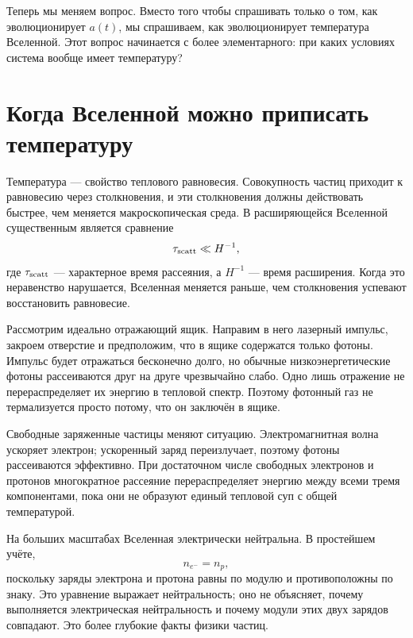 Теперь мы меняем вопрос. Вместо того чтобы спрашивать только о том, как эволюционирует \(a(t)\), мы спрашиваем, как эволюционирует температура Вселенной. Этот вопрос начинается с более элементарного: при каких условиях система вообще имеет температуру?

\section{Когда Вселенной можно приписать температуру}

Температура — свойство теплового равновесия. Совокупность частиц приходит к равновесию через столкновения, и эти столкновения должны действовать быстрее, чем меняется макроскопическая среда. В расширяющейся Вселенной существенным является сравнение
\begin{equation}
\tau_{\rm scatt}\ll H^{-1},
\label{eq:c07-equilibrium-condition}
\end{equation}
где \(\tau_{\rm scatt}\) — характерное время рассеяния, а \(H^{-1}\) — время расширения. Когда это неравенство нарушается, Вселенная меняется раньше, чем столкновения успевают восстановить равновесие.

Рассмотрим идеально отражающий ящик. Направим в него лазерный импульс, закроем отверстие и предположим, что в ящике содержатся только фотоны. Импульс будет отражаться бесконечно долго, но обычные низкоэнергетические фотоны рассеиваются друг на друге чрезвычайно слабо. Одно лишь отражение не перераспределяет их энергию в тепловой спектр. Поэтому фотонный газ не термализуется просто потому, что он заключён в ящике.

Свободные заряженные частицы меняют ситуацию. Электромагнитная волна ускоряет электрон; ускоренный заряд переизлучает, поэтому фотоны рассеиваются эффективно. При достаточном числе свободных электронов и протонов многократное рассеяние перераспределяет энергию между всеми тремя компонентами, пока они не образуют единый тепловой суп с общей температурой.

На больших масштабах Вселенная электрически нейтральна. В простейшем учёте,
\begin{equation}
n_{e^-}=n_p,
\label{eq:c07-neutrality}
\end{equation}
поскольку заряды электрона и протона равны по модулю и противоположны по знаку. Это уравнение выражает нейтральность; оно не объясняет, почему выполняется электрическая нейтральность и почему модули этих двух зарядов совпадают. Это более глубокие факты физики частиц.

